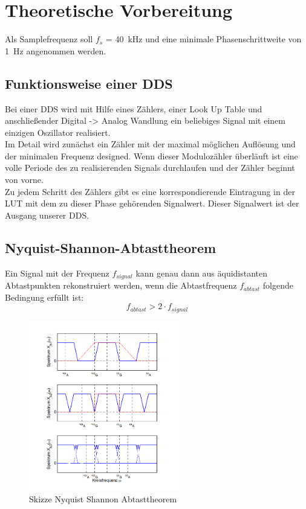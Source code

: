 \documentclass[a4paper,11pt,DIV=11,parskip=half]{scrartcl}
\begin{document}
	
	\tableofcontents
	\newpage
	\ihead{\headmark}
	\ofoot{\pagemark}

\section{Theoretische Vorbereitung}
Als Samplefrequenz soll $f_s$ = \SI{40}{kHz} und eine minimale Phasenschrittweite von \SI{1}{Hz}
angenommen werden.

\subsection{Funktionsweise einer DDS}
Bei einer DDS wird mit Hilfe eines Zählers, einer Look Up Table und anschließender Digital -> Analog Wandlung ein beliebiges Signal mit einem einzigen Oszillator realisiert. \\
Im Detail wird zunächst ein Zähler mit der maximal möglichen Auflösung und der minimalen Frequenz designed. Wenn dieser Modulozähler überläuft ist eine volle Periode des zu realisierenden Signals durchlaufen und der Zähler beginnt von vorne. \\
Zu jedem Schritt des Zählers gibt es eine korrespondierende Eintragung in der LUT mit dem zu dieser Phase gehörenden Signalwert. Dieser Signalwert ist der Ausgang unserer DDS.
\subsection{Nyquist-Shannon-Abtasttheorem}
Ein Signal mit der Frequenz $f_{signal}$ kann genau dann aus äquidistanten Abtastpunkten rekonstruiert werden, wenn die Abtastfrequenz $f_{abtast}$ folgende Bedingung erfüllt ist: 
\begin{equation}
	f_{abtast} >  2 \cdot  f_{signal}
\end{equation} 
\begin{figure}[H]
	\centering
	\includegraphics[width=0.6\textwidth]{Bilder/Nyquist_Shannon_Skizze.png}
	\caption{Skizze Nyquist Shannon Abtasttheorem}
	\label{fig:Nyquist_Shannon}
\end{figure}
\end{document}

